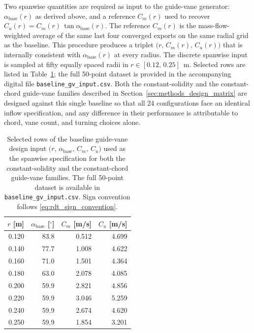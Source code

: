 Two spanwise quantities are required as input to the guide-vane
generator: $\alpha_{\mathrm{base}}(r)$ as derived above, and a
reference $C_m(r)$ used to recover $C_u(r) =
C_m(r)\,\tan\alpha_{\mathrm{base}}(r)$. The reference $C_m(r)$ is the
mass-flow-weighted average of the same last four converged exports on
the same radial grid as the baseline. This procedure produces a triplet
$\bigl(r,\,C_m(r),\,C_u(r)\bigr)$ that is internally consistent with
$\alpha_{\mathrm{base}}(r)$ at every radius. The discrete spanwise
input is sampled at fifty equally spaced radii in
$r\in[0.12,\,0.25]$~m. Selected rows are listed in
Table~\ref{tab:rdt_baseline_gv_input}; the full 50-point dataset is
provided in the accompanying digital file
\texttt{baseline\_gv\_input.csv}. Both the constant-solidity and the
constant-chord guide-vane families described in
Section~\ref{sec:methods_design_matrix} are designed against this
single baseline so that all 24 configurations face an identical inflow
specification, and any difference in their performance is attributable
to chord, vane count, and turning choices alone.
 
\begin{table}[H]
  \centering
  \caption[Selected rows of the baseline GV design input]{Selected rows
  of the baseline guide-vane design input
  $\bigl(r,\,\alpha_{\mathrm{base}},\,C_m,\,C_u\bigr)$ used as the
  spanwise specification for both the constant-solidity and the
  constant-chord guide-vane families. The full 50-point dataset is
  available in \texttt{baseline\_gv\_input.csv}. Sign convention follows
  \eqref{eq:rdt_sign_convention}.}
  \label{tab:rdt_baseline_gv_input}
  \begin{tabular}{rrrr}
    \hline
    $r$ [m] & $\alpha_{\mathrm{base}}$ [$^\circ$] & $C_m$ [m/s] & $C_u$ [m/s] \\
    \hline
    0.120  & 83.8 & 0.512 & 4.699 \\
    0.140  & 77.7 & 1.008 & 4.622 \\
    0.160  & 71.0 & 1.501 & 4.364 \\
    0.180  & 63.0 & 2.078 & 4.085 \\
    0.200  & 59.9 & 2.821 & 4.856 \\
    0.220  & 59.9 & 3.046 & 5.259 \\
    0.240  & 59.9 & 2.674 & 4.620 \\
    0.250  & 59.9 & 1.854 & 3.201 \\
    \hline
  \end{tabular}
\end{table}
 
